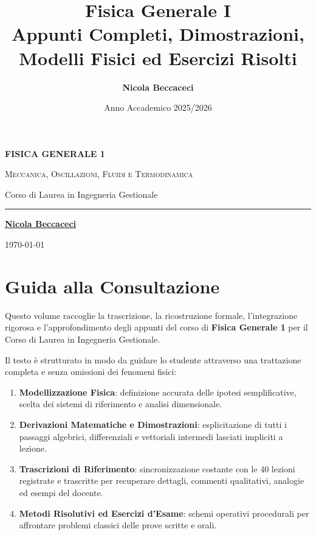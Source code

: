 \documentclass[11pt,a4paper,twoside,openright]{book}
\title{\Huge\textbf{\textsf{Fisica Generale I}}\\[0.5em]
\Large\textsf{Appunti Completi, Dimostrazioni, Modelli Fisici ed Esercizi Risolti}}
\author{\textbf{\textsf{Nicola Beccaceci}}}
\date{\textsf{Anno Accademico 2025/2026}}
\begin{document}
\frontmatter
\begin{titlepage}
    \centering
    \vspace*{2cm}
    {\Huge\bfseries\color{navyblue} FISICA GENERALE 1\par}
    \vspace{0.8cm}
    {\Large\scshape Meccanica, Oscillazioni, Fluidi e Termodinamica\par}
    \vspace{0.5cm}
    {\large\textsf{Corso di Laurea in Ingegneria Gestionale}\par}
    \vfill
    \rule{0.6\textwidth}{1.2pt}\par
    \vspace{1cm}
    {\large\textbf{\underline{Nicola Beccaceci}}\par}
    \vspace{0.5cm}
    {\small \today\par}
    \vspace*{2cm}
\end{titlepage}

\tableofcontents
\cleardoublepage

\chapter*{Guida alla Consultazione}
Questo volume raccoglie la trascrizione, la ricostruzione formale, l'integrazione rigorosa e l'approfondimento degli appunti del corso di \textbf{Fisica Generale 1} per il Corso di Laurea in Ingegneria Gestionale.

Il testo è strutturato in modo da guidare lo studente attraverso una trattazione completa e senza omissioni dei fenomeni fisici:
\begin{enumerate}
    \item \textbf{Modellizzazione Fisica}: definizione accurata delle ipotesi semplificative, scelta dei sistemi di riferimento e analisi dimensionale.
    \item \textbf{Derivazioni Matematiche e Dimostrazioni}: esplicitazione di tutti i passaggi algebrici, differenziali e vettoriali intermedi lasciati impliciti a lezione.
    \item \textbf{Trascrizioni di Riferimento}: sincronizzazione costante con le 40 lezioni registrate e trascritte per recuperare dettagli, commenti qualitativi, analogie ed esempi del docente.
    \item \textbf{Metodi Risolutivi ed Esercizi d'Esame}: schemi operativi procedurali per affrontare problemi classici delle prove scritte e orali.
\end{enumerate}
\end{document}
